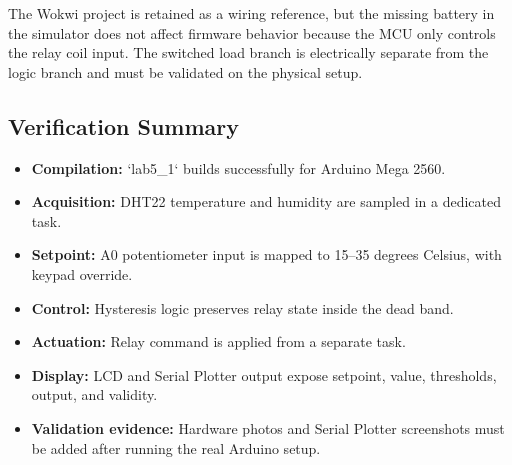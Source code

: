 The Wokwi project is retained as a wiring reference, but the missing battery in the simulator does not affect firmware behavior because the MCU only controls the relay coil input. The switched load branch is electrically separate from the logic branch and must be validated on the physical setup.

\subsection{Verification Summary}

\begin{itemize}
    \item \textbf{Compilation:} `lab5\_1` builds successfully for Arduino Mega 2560.
    \item \textbf{Acquisition:} DHT22 temperature and humidity are sampled in a dedicated task.
    \item \textbf{Setpoint:} A0 potentiometer input is mapped to 15--35 degrees Celsius, with keypad override.
    \item \textbf{Control:} Hysteresis logic preserves relay state inside the dead band.
    \item \textbf{Actuation:} Relay command is applied from a separate task.
    \item \textbf{Display:} LCD and Serial Plotter output expose setpoint, value, thresholds, output, and validity.
    \item \textbf{Validation evidence:} Hardware photos and Serial Plotter screenshots must be added after running the real Arduino setup.
\end{itemize}

